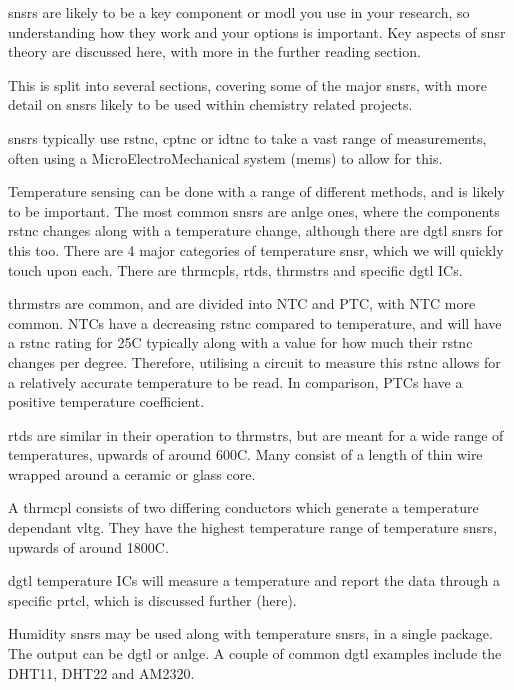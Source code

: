 \documentclass[a4paper,11pt]{report}
\begin{document}
\gls{snsr}s are likely to be a key component or \gls{modl} you use in your research, so understanding how they work and your options is important. Key aspects of \gls{snsr} theory are discussed here, with more in the further reading section.

This is split into several sections, covering some of the major \gls{snsr}s, with more detail on \gls{snsr}s likely to be used within chemistry related projects.

\gls{snsr}s typically use \gls{rstnc}, \gls{cptnc} or \gls{idtnc} to take a vast range of measurements, often using a MicroElectroMechanical system (\gls{mems}) to allow for this.

Temperature sensing can be done with a range of different methods, and is likely to be important. The most common \gls{snsr}s are \gls{anlge} ones, where the components \gls{rstnc} changes along with a temperature change, although there are \gls{dgtl} \gls{snsr}s for this too. There are 4 major categories of temperature \gls{snsr}, which we will quickly touch upon each. There are \gls{thrmcpl}s, \gls{rtd}s, \gls{thrmstr}s and specific \gls{dgtl} ICs.

\gls{thrmstr}s are common, and are divided into NTC and PTC, with NTC more common. NTCs have a decreasing \gls{rstnc} compared to temperature, and will have a \gls{rstnc} rating for 25\degree C typically along with a value for how much their \gls{rstnc} changes per degree. Therefore, utilising a circuit to measure this \gls{rstnc} allows for a relatively accurate temperature to be read. In comparison, PTCs have a positive temperature coefficient.

\gls{rtd}s are similar in their operation to \gls{thrmstr}s, but are meant for a wide range of temperatures, upwards of around 600C. Many consist of a length of thin wire wrapped around a ceramic or glass \gls{core}.

A \gls{thrmcpl} consists of two differing conductors which generate a temperature dependant \gls{vltg}. They have the highest temperature range of temperature \gls{snsr}s, upwards of around 1800C.

\gls{dgtl} temperature ICs will measure a temperature and report the data through a specific \gls{prtcl}, which is discussed further (here).


Humidity \gls{snsr}s may be used along with temperature \gls{snsr}s, in a single package. The output can be \gls{dgtl} or \gls{anlge}. A couple of common \gls{dgtl} examples include the DHT11, DHT22 and AM2320.
\end{document}
